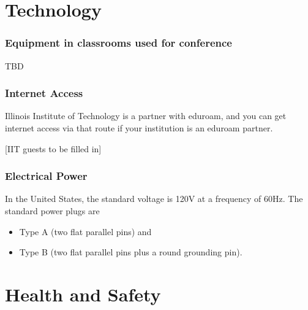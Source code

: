

\section{Technology}

\subsubsection{Equipment in classrooms used for conference}

TBD


\subsubsection{Internet Access}

Illinois Institute of Technology is a partner with eduroam, and you can get internet access via that route if your institution is an eduroam partner.

[IIT guests to be filled in]

\subsubsection{Electrical Power}

In the United States, the standard voltage is 120V at a frequency of 60Hz.  The standard power plugs are 
\begin{itemize}
	\item Type A (two flat parallel pins) and 
	\item Type B (two flat parallel pins plus a round grounding pin).
\end{itemize}

\section{Health and Safety}

